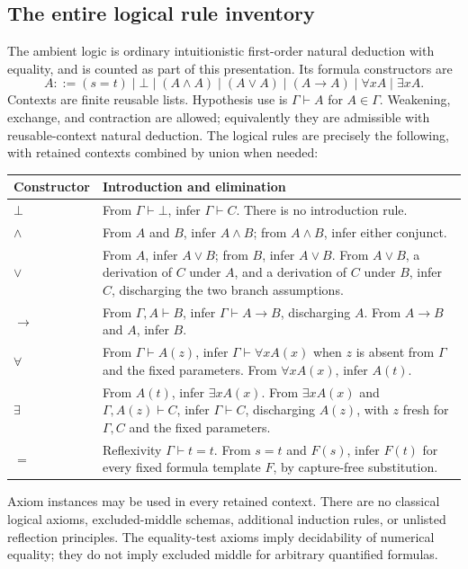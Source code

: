 \subsection{The entire logical rule inventory}
The ambient logic is ordinary intuitionistic first-order natural deduction with equality, and is counted as part of this presentation. Its formula constructors are
\[
 A::=(s=t)\mid\bot\mid(A\land A)\mid(A\lor A)\mid(A\to A)
       \mid\forall x A\mid\exists x A.
\]
Contexts are finite reusable lists. Hypothesis use is $\Gamma\vdash A$ for $A\in\Gamma$. Weakening, exchange, and contraction are allowed; equivalently they are admissible with reusable-context natural deduction. The logical rules are precisely the following, with retained contexts combined by union when needed:
\begin{center}\small
\begin{tabularx}{\linewidth}{@{}lX@{}}
\toprule
Constructor & Introduction and elimination\\\midrule
$\bot$ & From $\Gamma\vdash\bot$, infer $\Gamma\vdash C$. There is no introduction rule.\\[3pt]
$\land$ & From $A$ and $B$, infer $A\land B$; from $A\land B$, infer either conjunct.\\[3pt]
$\lor$ & From $A$, infer $A\lor B$; from $B$, infer $A\lor B$. From $A\lor B$, a derivation of $C$ under $A$, and a derivation of $C$ under $B$, infer $C$, discharging the two branch assumptions.\\[3pt]
$\to$ & From $\Gamma,A\vdash B$, infer $\Gamma\vdash A\to B$, discharging $A$. From $A\to B$ and $A$, infer $B$.\\[3pt]
$\forall$ & From $\Gamma\vdash A(z)$, infer $\Gamma\vdash\forall xA(x)$ when $z$ is absent from $\Gamma$ and the fixed parameters. From $\forall xA(x)$, infer $A(t)$.\\[3pt]
$\exists$ & From $A(t)$, infer $\exists xA(x)$. From $\exists xA(x)$ and $\Gamma,A(z)\vdash C$, infer $\Gamma\vdash C$, discharging $A(z)$, with $z$ fresh for $\Gamma,C$ and the fixed parameters.\\[3pt]
$=$ & Reflexivity $\Gamma\vdash t=t$. From $s=t$ and $F(s)$, infer $F(t)$ for every fixed formula template $F$, by capture-free substitution.\\
\bottomrule
\end{tabularx}\end{center}
Axiom instances may be used in every retained context. There are no classical logical axioms, excluded-middle schemas, additional induction rules, or unlisted reflection principles. The equality-test axioms imply decidability of numerical equality; they do not imply excluded middle for arbitrary quantified formulas.

